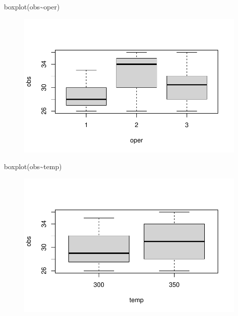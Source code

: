 \documentclass[
  letterpaper,
  DIV=11,
  numbers=noendperiod]{scrartcl}
\newenvironment{Shaded}{\begin{snugshade}}{\end{snugshade}}
\newcommand{\FunctionTok}[1]{\textcolor[rgb]{0.28,0.35,0.67}{#1}}
\newcommand{\NormalTok}[1]{\textcolor[rgb]{0.00,0.23,0.31}{#1}}
\newcommand{\SpecialCharTok}[1]{\textcolor[rgb]{0.37,0.37,0.37}{#1}}
\begin{document}
\begin{Shaded}
\begin{Highlighting}[]
\FunctionTok{boxplot}\NormalTok{(obs}\SpecialCharTok{\textasciitilde{}}\NormalTok{oper)}
\end{Highlighting}
\end{Shaded}

\begin{figure}[H]

{\centering \includegraphics{fatorial_multi_files/figure-pdf/unnamed-chunk-3-2.pdf}

}

\end{figure}

\begin{Shaded}
\begin{Highlighting}[]
\FunctionTok{boxplot}\NormalTok{(obs}\SpecialCharTok{\textasciitilde{}}\NormalTok{temp)}
\end{Highlighting}
\end{Shaded}

\begin{figure}[H]

{\centering \includegraphics{fatorial_multi_files/figure-pdf/unnamed-chunk-3-3.pdf}

}

\end{figure}
\end{document}
